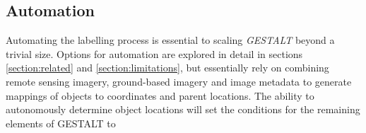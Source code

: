 \subsection{Automation}
Automating the labelling process is essential to scaling \textit{GESTALT} beyond a trivial size. 
Options for automation are explored in detail in sections \ref{section:related} and \ref{section:limitations}, but essentially rely on combining remote sensing imagery, ground-based imagery and image metadata to generate mappings of objects to coordinates and parent locations.
The ability to autonomously determine object locations will set the conditions for the remaining elements of GESTALT to  



